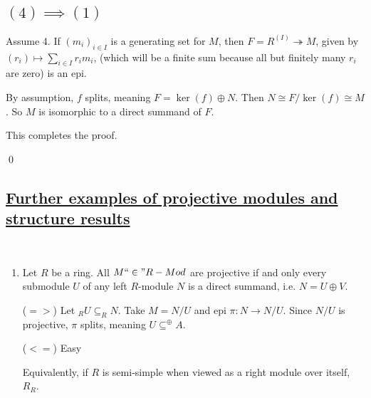 \documentclass[x11names,reqno,14pt]{extarticle}
\newcommand{\fin}{``\in"}
\newcommand{\onto}{\twoheadrightarrow}
\begin{document}
\subsection*{$(4)\implies(1)$}

Assume 4. If $(m_i)_{i\in I}$ is a generating set for $M$, then $F = R^{(I)}\onto M$, given by $(r_i)\mapsto\sum_{i\in I}r_im_i$, (which will be a finite sum because all but finitely many $r_i$ are zero) is an epi. 

By assumption, $f$ splits, meaning $F = \ker(f)\oplus N$. Then $N \cong F/\ker(f)\cong M$. So $M$ is isomorphic to a direct summand of $F$. 

This completes the proof.

\qed

\subsection*{\underline{Further examples of projective modules and structure results}}

\exm\,

\begin{enumerate}

\item Let $R$ be a ring. All $M \fin R-Mod$ are projective if and only every submodule $U$ of any left $R$-module $N$ is a direct summand, i.e. $N = U \oplus V$. 

($=>$)
Let $_RU\subseteq _RN$. Take $M = N/U$ and epi $\pi:N\to N/U$. Since $N/U$ is projective, $\pi$ splits, meaning $U \subseteq^{\oplus}A$. 

($<=$)
Easy

Equivalently, if $R$ is semi-simple when viewed as a right module over itself, $R_R$.

\end{enumerate}
\end{document}
